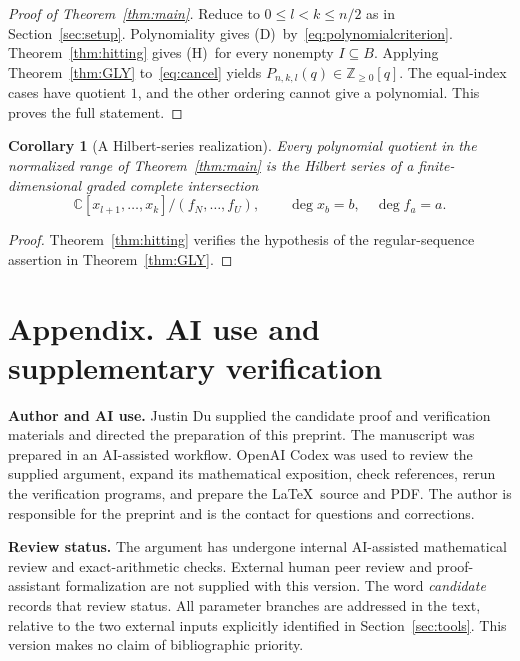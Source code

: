 \documentclass[11pt,a4paper]{article}
\numberwithin{equation}{section}
\newtheorem{corollary}[theorem]{Corollary}
\theoremstyle{remark}
\newcommand{\Nzero}{\mathbb Z_{\ge 0}}
\newcommand{\C}{\mathbb C}
\newcommand{\Dcond}{\textup{(D)}}
\newcommand{\Hcond}{\textup{(H)}}
\begin{document}
\begin{proof}[Proof of Theorem~\ref{thm:main}]
Reduce to $0\le l<k\le n/2$ as in Section~\ref{sec:setup}.
Polynomiality gives \Dcond\ by~\eqref{eq:polynomialcriterion}.
Theorem~\ref{thm:hitting} gives \Hcond\ for every nonempty
$I\subseteq B$.
Applying Theorem~\ref{thm:GLY} to~\eqref{eq:cancel} yields
$P_{n,k,l}(q)\in\Nzero[q]$.
The equal-index cases have quotient $1$, and the other ordering
cannot give a polynomial. This proves the full statement.
\end{proof}

\begin{corollary}[A Hilbert-series realization]\label{cor:hilbert}
Every polynomial quotient in the normalized range of
Theorem~\ref{thm:main} is the Hilbert series of a finite-dimensional
graded complete intersection
\[
  \C[x_{l+1},\ldots,x_k]/(f_N,\ldots,f_U),
  \qquad \deg x_b=b,\quad \deg f_a=a.
\]
\end{corollary}

\begin{proof}
Theorem~\ref{thm:hitting} verifies the hypothesis of the
regular-sequence assertion in Theorem~\ref{thm:GLY}.
\end{proof}

\section*{Appendix. AI use and supplementary verification}

\textbf{Author and AI use.}
Justin Du supplied the candidate proof and verification materials and
directed the preparation of this preprint.
The manuscript was prepared in an AI-assisted workflow.
OpenAI Codex was used to review the supplied argument, expand its
mathematical exposition, check references, rerun the verification programs,
and prepare the \LaTeX\ source and PDF.
The author is responsible for the preprint and is the contact for
questions and corrections.

\textbf{Review status.}
The argument has undergone internal AI-assisted mathematical review
and exact-arithmetic checks. External human peer review and
proof-assistant formalization are not supplied with this version.
The word \emph{candidate} records that review status.
All parameter branches are addressed in the text, relative to the two
external inputs explicitly identified in Section~\ref{sec:tools}.
This version makes no claim of bibliographic priority.
\end{document}
